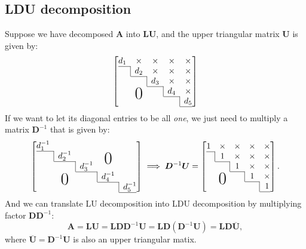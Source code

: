 \subsection{LDU decomposition}
Suppose we have decomposed $\bm A$ into $\bm{LU}$, and the upper triangular matrix $\bm U$ is given by:
\[
\left[
    \begin{array}{@{}ccccc@{}}
    d_1    & \x       & \x    & \x    & \x \\ \cline{1-1}
    \bord & d_2       & \x    & \x    & \x \\ \cline{2-2}
          & \bord    & d_3    & \x    & \x \\ \cline{3-3}
          & \bigzero & \bord & d_4    & \x \\ \cline{4-4}
          &          &       & \bord & d_5 \\ \cline{5-5}
  \end{array}\right]
\]
If we want to let its diagonal entries to be all \emph{one}, we just need to multiply a matrix $\bm D^{-1}$ that is
given by:
\[
\left[
    \begin{array}{@{}ccccc@{}}
    d_1^{-1}    &        &     &     &  \\ \cline{1-1}
    \bord & d_2^{-1}       &    &  \bigzero   &  \\ \cline{2-2}
          & \bord    & d_3^{-1}    &     &  \\ \cline{3-3}
          & \bigzero & \bord & d_4^{-1}    &  \\ \cline{4-4}
          &          &       & \bord & d_5^{-1} \\ \cline{5-5}
  \end{array}\right]
\implies
\bm D^{-1}\bm U=
\left[
    \begin{array}{@{}ccccc@{}}
    1    & \x       & \x    & \x    & \x \\ \cline{1-1}
    \bord & 1       & \x    & \x    & \x \\ \cline{2-2}
          & \bord    & 1    & \x    & \x \\ \cline{3-3}
          & \bigzero & \bord & 1    & \x \\ \cline{4-4}
          &          &       & \bord & 1 \\ \cline{5-5}
  \end{array}\right].
\]
And we can translate LU decomposition into LDU decomposition by multiplying factor $\bm D\bm D^{-1}$:
\[
\bm A=\bm L\bm U=\bm L\bm D\bm D^{-1}\bm U
=\bm L\bm D(\bm D^{-1}\bm U)
=\bm L\bm D\overline{\bm U},
\]
where $\overline{\bm U}=\bm D^{-1}\bm U$ is also an upper triangular matix.\\

